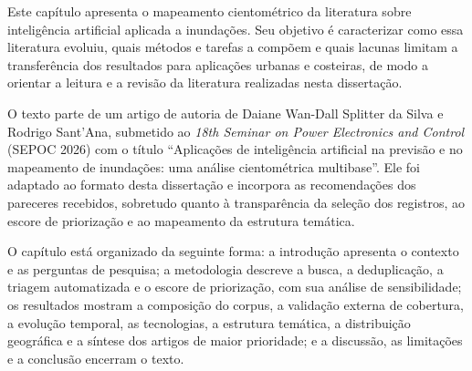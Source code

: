 %


Este capítulo apresenta o mapeamento cientométrico da literatura sobre inteligência artificial aplicada a inundações. Seu objetivo é caracterizar como essa literatura evoluiu, quais métodos e tarefas a compõem e quais lacunas limitam a transferência dos resultados para aplicações urbanas e costeiras, de modo a orientar a leitura e a revisão da literatura realizadas nesta dissertação.

O texto parte de um artigo de autoria de Daiane Wan-Dall Splitter da Silva e Rodrigo Sant'Ana, submetido ao \emph{18th Seminar on Power Electronics and Control} (SEPOC 2026) com o título ``Aplicações de inteligência artificial na previsão e no mapeamento de inundações: uma análise cientométrica multibase''. Ele foi adaptado ao formato desta dissertação e incorpora as recomendações dos pareceres recebidos, sobretudo quanto à transparência da seleção dos registros, ao escore de priorização e ao mapeamento da estrutura temática.

O capítulo está organizado da seguinte forma: a introdução apresenta o contexto e as perguntas de pesquisa; a metodologia descreve a busca, a deduplicação, a triagem automatizada e o escore de priorização, com sua análise de sensibilidade; os resultados mostram a composição do corpus, a validação externa de cobertura, a evolução temporal, as tecnologias, a estrutura temática, a distribuição geográfica e a síntese dos artigos de maior prioridade; e a discussão, as limitações e a conclusão encerram o texto.

